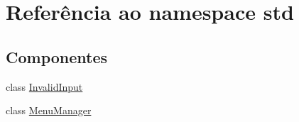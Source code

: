 \hypertarget{namespacestd}{}\section{Referência ao namespace std}
\label{namespacestd}
\subsection*{Componentes}
\begin{DoxyCompactItemize}
\item 
class \hyperlink{classstd_1_1_invalid_input}{Invalid\+Input}
\item 
class \hyperlink{classstd_1_1_menu_manager}{Menu\+Manager}
\end{DoxyCompactItemize}
